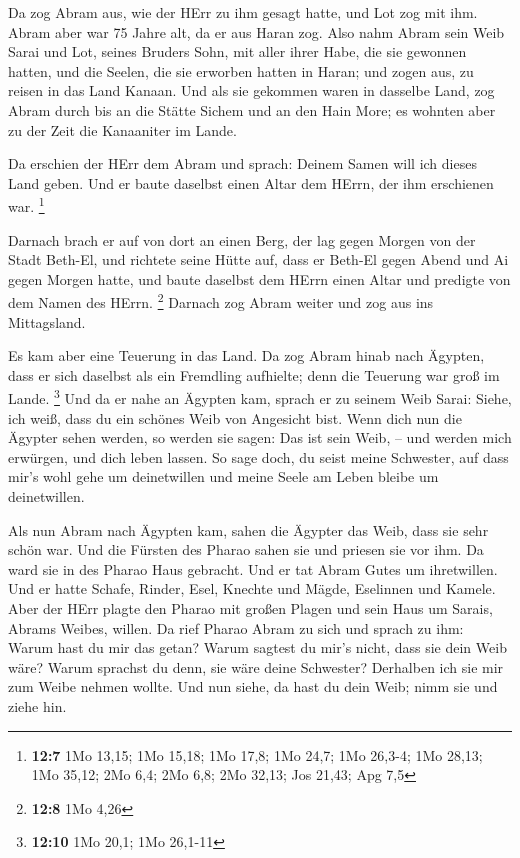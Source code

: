 Da zog Abram aus, wie der HErr zu ihm gesagt hatte, und Lot
zog mit ihm. Abram aber war 75 Jahre alt, da er aus Haran zog.
 Also nahm Abram sein Weib Sarai und Lot, seines Bruders
Sohn, mit aller ihrer Habe, die sie gewonnen hatten, und die Seelen, die
sie erworben hatten in Haran; und zogen aus, zu reisen in das Land
Kanaan. Und als sie gekommen waren in dasselbe Land,  zog
Abram durch bis an die Stätte Sichem und an den Hain More; es wohnten
aber zu der Zeit die Kanaaniter im Lande.

 Da erschien der HErr dem Abram und sprach: Deinem Samen
will ich dieses Land geben. Und er baute daselbst einen Altar dem HErrn,
der ihm erschienen war. \footnote{\textbf{12:7} 1Mo 13,15; 1Mo 15,18;
  1Mo 17,8; 1Mo 24,7; 1Mo 26,3-4; 1Mo 28,13; 1Mo 35,12; 2Mo 6,4; 2Mo
  6,8; 2Mo 32,13; Jos 21,43; Apg 7,5}

 Darnach brach er auf von dort an einen Berg, der lag gegen
Morgen von der Stadt Beth-El, und richtete seine Hütte auf, dass er
Beth-El gegen Abend und Ai gegen Morgen hatte, und baute daselbst dem
HErrn einen Altar und predigte von dem Namen des HErrn. \footnote{\textbf{12:8}
  1Mo 4,26}  Darnach zog Abram weiter und zog aus ins
Mittagsland.

 Es kam aber eine Teuerung in das Land. Da zog Abram hinab
nach Ägypten, dass er sich daselbst als ein Fremdling aufhielte; denn
die Teuerung war groß im Lande. \footnote{\textbf{12:10} 1Mo 20,1; 1Mo
  26,1-11}  Und da er nahe an Ägypten kam, sprach er zu
seinem Weib Sarai: Siehe, ich weiß, dass du ein schönes Weib von
Angesicht bist.  Wenn dich nun die Ägypter sehen werden, so
werden sie sagen: Das ist sein Weib, -- und werden mich erwürgen, und
dich leben lassen.  So sage doch, du seist meine Schwester,
auf dass mir's wohl gehe um deinetwillen und meine Seele am Leben bleibe
um deinetwillen.

 Als nun Abram nach Ägypten kam, sahen die Ägypter das
Weib, dass sie sehr schön war.  Und die Fürsten des Pharao
sahen sie und priesen sie vor ihm. Da ward sie in des Pharao Haus
gebracht.  Und er tat Abram Gutes um ihretwillen. Und er
hatte Schafe, Rinder, Esel, Knechte und Mägde, Eselinnen und Kamele.
 Aber der HErr plagte den Pharao mit großen Plagen und sein
Haus um Sarais, Abrams Weibes, willen.  Da rief Pharao
Abram zu sich und sprach zu ihm: Warum hast du mir das getan? Warum
sagtest du mir's nicht, dass sie dein Weib wäre?  Warum
sprachst du denn, sie wäre deine Schwester? Derhalben ich sie mir zum
Weibe nehmen wollte. Und nun siehe, da hast du dein Weib; nimm sie und
ziehe hin.

